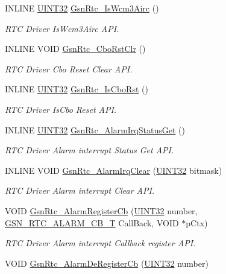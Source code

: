 \begin{DoxyCompactItemize}
INLINE \hyperlink{a00660_gae1e6edbbc26d6fbc71a90190d0266018}{UINT32} \hyperlink{a00651_ga58b4ca2b64aa5c74b2b37b4d11b1bf18}{GsnRtc\_\-IsWcm3Airc} ()
\begin{DoxyCompactList}\small\item\em RTC Driver IsWcm3Airc API. \end{DoxyCompactList}\item 
INLINE VOID \hyperlink{a00651_ga3365cb4710337f2a1c7bd6659a5d5f41}{GsnRtc\_\-CboRstClr} ()
\begin{DoxyCompactList}\small\item\em RTC Driver Cbo Reset Clear API. \end{DoxyCompactList}\item 
INLINE \hyperlink{a00660_gae1e6edbbc26d6fbc71a90190d0266018}{UINT32} \hyperlink{a00651_ga1f5315d552e66d73b39f0f328f4e6005}{GsnRtc\_\-IsCboRst} ()
\begin{DoxyCompactList}\small\item\em RTC Driver IsCbo Reset API. \end{DoxyCompactList}\item 
INLINE \hyperlink{a00660_gae1e6edbbc26d6fbc71a90190d0266018}{UINT32} \hyperlink{a00651_gafcd931e3dc1dbfe114beb37e38eb2f78}{GsnRtc\_\-AlarmIrqStatusGet} ()
\begin{DoxyCompactList}\small\item\em RTC Driver Alarm interrupt Status Get API. \end{DoxyCompactList}\item 
INLINE VOID \hyperlink{a00651_ga4f7823684634c18971a213e32d4ebcf1}{GsnRtc\_\-AlarmIrqClear} (\hyperlink{a00660_gae1e6edbbc26d6fbc71a90190d0266018}{UINT32} bitmask)
\begin{DoxyCompactList}\small\item\em RTC Driver Alarm interrupt Clear API. \end{DoxyCompactList}\item 
VOID \hyperlink{a00651_ga2b1fc2ebca2e882feb0edf4dcce10ae1}{GsnRtc\_\-AlarmRegisterCb} (\hyperlink{a00660_gae1e6edbbc26d6fbc71a90190d0266018}{UINT32} number, \hyperlink{a00582_a624c15b10850050c5064e7949e4bd15f}{GSN\_\-RTC\_\-ALARM\_\-CB\_\-T} CallBack, VOID $\ast$pCtx)
\begin{DoxyCompactList}\small\item\em RTC Driver Alarm interrupt Callback register API. \end{DoxyCompactList}\item 
VOID \hyperlink{a00651_ga113ab50d758e2a3aa9231666c14e5caa}{GsnRtc\_\-AlarmDeRegisterCb} (\hyperlink{a00660_gae1e6edbbc26d6fbc71a90190d0266018}{UINT32} number)

\end{DoxyCompactItemize}
